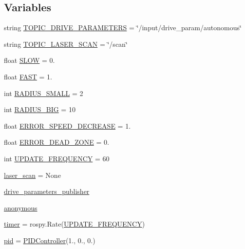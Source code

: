 \subsection*{Variables}
\begin{DoxyCompactItemize}
\item 
string \hyperlink{namespacewallfollowing_a765ce45df7d0c3d9134fc83534029e36}{T\+O\+P\+I\+C\+\_\+\+D\+R\+I\+V\+E\+\_\+\+P\+A\+R\+A\+M\+E\+T\+E\+RS} = \char`\"{}/input/drive\+\_\+param/autonomous\char`\"{}
\item 
string \hyperlink{namespacewallfollowing_a7e38e617465ebdfa7ec0576ac63443f8}{T\+O\+P\+I\+C\+\_\+\+L\+A\+S\+E\+R\+\_\+\+S\+C\+AN} = \char`\"{}/scan\char`\"{}
\item 
float \hyperlink{namespacewallfollowing_a30a4013dbd3a6ea5275fbed3fe35da22}{S\+L\+OW} = 0.
\item 
float \hyperlink{namespacewallfollowing_ab1e7c06b4efb8e38a97ac8ec783a6beb}{F\+A\+ST} = 1.
\item 
int \hyperlink{namespacewallfollowing_aa59c6dfd10cb4f1550367b3268417436}{R\+A\+D\+I\+U\+S\+\_\+\+S\+M\+A\+LL} = 2
\item 
int \hyperlink{namespacewallfollowing_a4b502375f79f9fcc2a823cc60da7bee0}{R\+A\+D\+I\+U\+S\+\_\+\+B\+IG} = 10
\item 
float \hyperlink{namespacewallfollowing_a6e8aff0586478dde973909ebe62f58a5}{E\+R\+R\+O\+R\+\_\+\+S\+P\+E\+E\+D\+\_\+\+D\+E\+C\+R\+E\+A\+SE} = 1.
\item 
float \hyperlink{namespacewallfollowing_ac87d5f143cfd44f170a1d385ebd1a71b}{E\+R\+R\+O\+R\+\_\+\+D\+E\+A\+D\+\_\+\+Z\+O\+NE} = 0.
\item 
int \hyperlink{namespacewallfollowing_a7ba7bea964894fd6f3def270bd3afa43}{U\+P\+D\+A\+T\+E\+\_\+\+F\+R\+E\+Q\+U\+E\+N\+CY} = 60
\item 
\hyperlink{namespacewallfollowing_a35ff373c811db70d98205347a736c606}{laser\+\_\+scan} = None
\item 
\hyperlink{namespacewallfollowing_aa69138defbbc5f21e99db50a6b3c903f}{drive\+\_\+parameters\+\_\+publisher}
\item 
\hyperlink{namespacewallfollowing_a005968f85117845c036ef1cbd61034bb}{anonymous}
\item 
\hyperlink{namespacewallfollowing_a57288dd797e0bd15012f3ebf1670ce38}{timer} = rospy.\+Rate(\hyperlink{namespacewallfollowing_a7ba7bea964894fd6f3def270bd3afa43}{U\+P\+D\+A\+T\+E\+\_\+\+F\+R\+E\+Q\+U\+E\+N\+CY})
\item 
\hyperlink{namespacewallfollowing_adc9f95e0b626be8ddae98a596a38e7e8}{pid} = \hyperlink{classwallfollowing_1_1_p_i_d_controller}{P\+I\+D\+Controller}(1., 0., 0.)
\end{DoxyCompactItemize}


